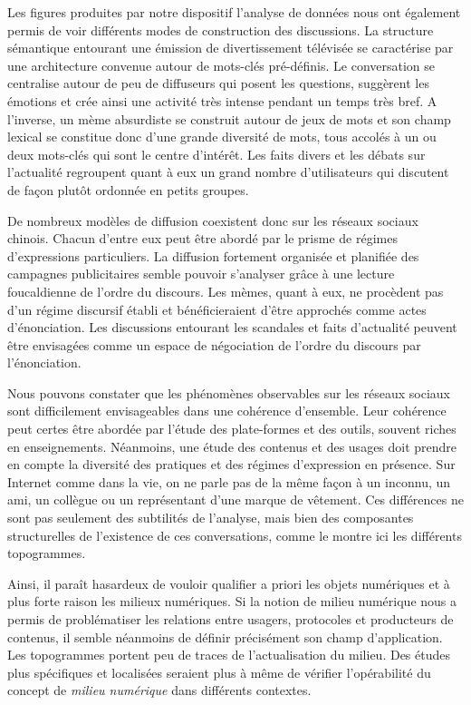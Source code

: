 Les figures produites par notre dispositif l'analyse de données nous ont également permis de voir différents modes de construction des discussions. La structure sémantique entourant une émission de divertissement télévisée se 
caractérise par une architecture convenue autour de mots-clés pré-définis. Le conversation se centralise autour de peu de diffuseurs qui posent les questions, suggèrent les émotions et crée ainsi une activité très intense pendant un temps très bref. A l'inverse, un mème absurdiste se construit autour de jeux de mots et son champ lexical se constitue donc d'une grande diversité de mots, tous accolés à un ou deux mots-clés qui sont le centre d'intérêt. Les faits divers et les débats sur l'actualité regroupent quant à eux un grand nombre d'utilisateurs qui discutent de façon plutôt ordonnée en petits groupes.

De nombreux modèles de diffusion coexistent donc sur les réseaux sociaux chinois. Chacun d'entre eux peut être abordé par le prisme de régimes d'expressions particuliers. La diffusion fortement organisée et planifiée des campagnes publicitaires semble pouvoir s'analyser grâce à une lecture foucaldienne de l'ordre du discours. Les mèmes, quant à eux,  ne procèdent pas d'un régime discursif établi et bénéficieraient d'être approchés comme actes d'énonciation. Les discussions entourant les scandales et faits d'actualité peuvent être envisagées comme un espace de négociation de l'ordre du discours par l'énonciation.

Nous pouvons constater que les phénomènes observables sur les réseaux sociaux sont difficilement envisageables dans une cohérence d'ensemble. Leur cohérence peut certes être abordée par l'étude des plate-formes et des outils, souvent riches en enseignements. Néanmoins, une étude des contenus et des usages doit prendre en compte la diversité des pratiques et des régimes d'expression en présence. Sur Internet comme dans la vie, on ne parle pas de la même façon à un inconnu, un ami, un collègue ou un représentant d'une marque de vêtement. Ces différences ne sont pas seulement des subtilités de l'analyse, mais bien des composantes structurelles de l'existence de ces conversations, comme le montre ici les différents topogrammes. 

Ainsi, il paraît hasardeux de vouloir qualifier a priori les objets numériques et à plus forte raison les milieux numériques. Si la notion de milieu numérique nous a permis de problématiser les relations entre usagers, protocoles et producteurs de contenus, il semble néanmoins de définir précisément son champ d'application. Les topogrammes portent peu de traces de l'actualisation du milieu. Des études plus spécifiques et localisées seraient plus à même de vérifier l'opérabilité du concept de \textit{milieu numérique} dans différents contextes. 

